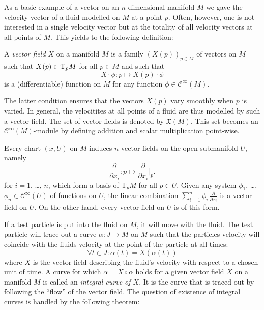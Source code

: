 As a basic example of a vector on an $n$-dimensional manifold $M$ we gave the velocity vector
of a fluid modelled on $M$ at a point $p$. Often, however, one is not interested
in a single velocity vector but at the totality of all velocity vectors at all
points of $M$. This yields to the following definition:

\begin{dfn}
  A \emph{vector field $X$} on a manifold $M$ is a family $(X(p))_{p \in M}$
  of vectors on $M$ such that $X(p) \in \mathrm T_p M$ for all $p \in M$ and such
  that
  \[
    X \cdot \phi\colon p \mapsto X(p) \cdot \phi
  \]
  is a (differentiable) function on $M$ for any function $\phi \in \mathcal
  C^\infty(M)$.
\end{dfn}
The latter condition ensures that the vectors $X(p)$ vary smoothly when $p$ is
varied. In general, the velocitites at all points of a fluid are thus modelled
by such a vector field. The set of vector fields is denoted by $\mathfrak X(M)$.
This set becomes an $\mathcal C^\infty(M)$-module by defining addition and
scalar multiplication point-wise.

Every chart $(x, U)$ on $M$ induces $n$ vector fields on the open submanifold
$U$, namely
\[
  \frac{\partial}{\partial x_i}\colon p \mapsto \frac{\partial}{\partial x_i}|_p.
\]
for $i = 1$, \dots, $n$, which form a basis of $\mathrm T_p M$ for all $p \in U$.
Given any system $\phi_1$, \dots, $\phi_n \in \mathcal C^\infty(U)$ of functions
on $U$, the linear combination $\sum_{i = 1}^n \phi_i \, \frac{\partial}{\partial x_i}$
is a vector field on $U$. On the other hand, every vector field on $U$ is of this
form.

If a test particle is put into the fluid on $M$, it will move with the fluid.
The test particle will trace out a curve $\alpha\colon J \to M$ on $M$ such that
the particles velocity will coincide with the fluids velocity at the point of
the particle at all times:
\[
  \forall t \in J: \dot\alpha(t) = X(\alpha(t))
\]
where $X$ is the vector field describing the fluid's velocity with respect to
a chosen unit of time. A curve for which $\dot \alpha = X \circ \alpha$ holds
for a given vector field $X$ on a manifold $M$ is called an \emph{integral
curve of $X$}. It is the curve that is traced out by following the ``flow'' of
the vector field. The question of existence of integral curves is handled by
the following theorem:

